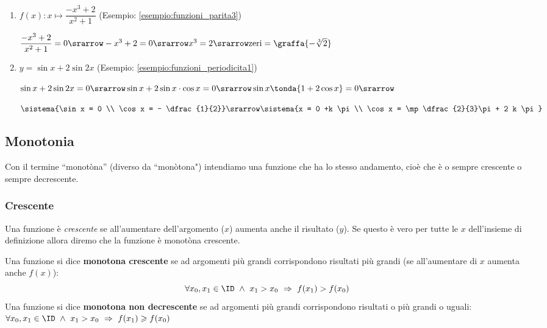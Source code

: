\begin{esempio}
\begin{enumerate}
\item  \quad \(f(x): x \mapsto \dfrac{-x^3 +2}{x^2 +1}\)
(Esempio: \ref{esempio:funzioni_parita3})

\(\dfrac{-x^3 +2}{x^2 +1} = 0 \srarrow -x^3 +2 = 0 \srarrow x^3 = 2 \srarrow 
\text{zeri} = \graffa{-\sqrt[3]{2}}\)

\item  \quad \(y = \sin x + 2 \sin 2x\)
(Esempio: \ref{esempio:funzioni_periodicita1})

\(\sin x + 2 \sin 2x = 0 \srarrow 
\sin x + 2 \sin x \cdot \cos x = 0 \srarrow 
\sin x \tonda{1 + 2 \cos x} = 0 \srarrow \)

\(\sistema{\sin x = 0 \\ \cos x = - \dfrac{1}{2}} \srarrow 
  \sistema{x = 0 +k \pi\\ \cos x = \mp \dfrac{2}{3}\pi + 2 k \pi}\)

\end{enumerate}

\end{esempio}

\subsection{Monotonia}

Con il termine  ``monotòna'' (diverso da  ``monòtona") intendiamo una 
funzione che ha lo stesso andamento, cioè che è o sempre crescente o sempre
decrescente.

\subsubsection{Crescente}

Una funzione è \emph{crescente} se all'aumentare dell'argomento (\(x\)) 
aumenta anche il risultato (\(y\)). 
Se questo è vero per tutte le \(x\) dell'insieme di 
definizione allora diremo che la funzione è monotòna crescente.

\begin{definizione}
Una funzione si dice \textbf{monotona crescente} se ad argomenti più grandi 
corrispondono risultati più grandi 
(se all'aumentare di \(x\) aumenta anche \(f(x)\)):
\[\forall x_0, x_1 \in \ID ~\land~ x_1 > x_0 ~\Rightarrow~ 
f(x_1) > f(x_0)\]
Una funzione si dice \textbf{monotona non decrescente} se ad argomenti più 
grandi corrispondono risultati o più grandi o uguali: \quad 
\(\forall x_0, x_1 \in \ID ~\land~ x_1 > x_0 ~\Rightarrow~ 
f(x_1) \geqslant f(x_0)\)
\end{definizione}

